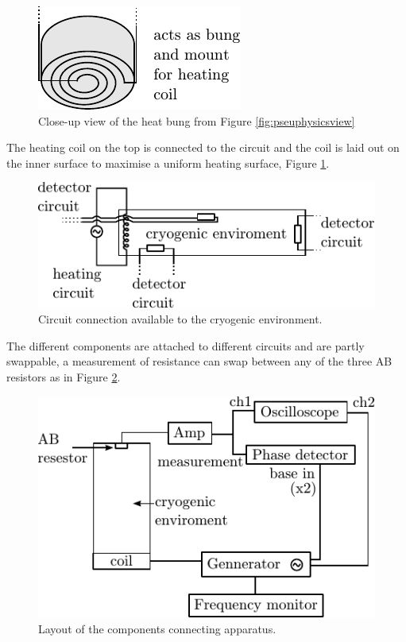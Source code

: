 \begin{figure}[htb]
\centering
\includegraphics{pics/heatingbung.pdf}
\caption{Close-up view of the heat bung from Figure \ref{fig:pseuphysicsview} \label{fig:heatingbung}}
\end{figure}

The heating coil on the top is connected to the circuit and the coil is 
laid out on the inner surface to maximise a uniform heating surface, Figure \ref{fig:heatingbung}.

\begin{figure}[htb]
\centering
\includegraphics{pics/circuitconnections.pdf}
\caption{Circuit connection available to the cryogenic environment. \label{fig:circuitconnections}}
\end{figure}

The different components are attached to different circuits and are partly swappable,
a measurement of resistance can swap between any of the three AB resistors as in Figure \ref{fig:circuitconnections}.

\begin{figure}[htb]
\centering
\includegraphics{pics/nodelayout.pdf}
\caption{Layout of the components connecting apparatus.  \label{fig:nodelayout}}
\end{figure}

